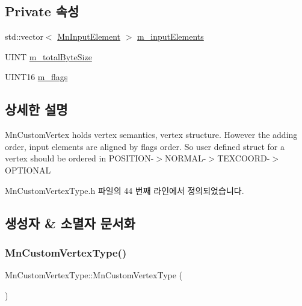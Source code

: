 \subsection*{Private 속성}
\begin{DoxyCompactItemize}
\item 
std\+::vector$<$ \hyperlink{class_m_n_l_1_1_mn_input_element}{Mn\+Input\+Element} $>$ \hyperlink{class_m_n_l_1_1_mn_custom_vertex_type_a965c3249b7bce95b3ef1cb5ce8c9e74e}{m\+\_\+input\+Elements}
\item 
U\+I\+NT \hyperlink{class_m_n_l_1_1_mn_custom_vertex_type_a07e3efae7a30c0c74665abf18426e336}{m\+\_\+total\+Byte\+Size}
\item 
U\+I\+N\+T16 \hyperlink{class_m_n_l_1_1_mn_custom_vertex_type_ac8677b700f6fec422fdbcc1071d24db6}{m\+\_\+flags}
\end{DoxyCompactItemize}


\subsection{상세한 설명}
Mn\+Custom\+Vertex holds vertex semantics, vertex structure. However the adding order, input elements are aligned by flags order. So user defined struct for a vertex should be ordered in P\+O\+S\+I\+T\+I\+O\+N-\/$>$N\+O\+R\+M\+A\+L-\/$>$T\+E\+X\+C\+O\+O\+R\+D-\/$>$O\+P\+T\+I\+O\+N\+AL 

Mn\+Custom\+Vertex\+Type.\+h 파일의 44 번째 라인에서 정의되었습니다.



\subsection{생성자 \& 소멸자 문서화}
\mbox{\label{class_m_n_l_1_1_mn_custom_vertex_type_afb415522e4178413b715a31c15fe3b8e}} 
\subsubsection{\texorpdfstring{Mn\+Custom\+Vertex\+Type()}{MnCustomVertexType()}}
{\footnotesize\ttfamily Mn\+Custom\+Vertex\+Type\+::\+Mn\+Custom\+Vertex\+Type (\begin{DoxyParamCaption}{ }\end{DoxyParamCaption})}



